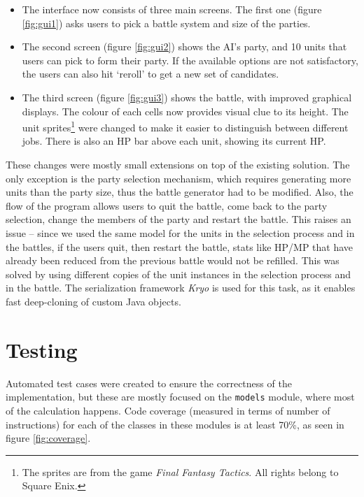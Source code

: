 \begin{itemize}
	\item The interface now consists of three main screens. The first one (figure \ref{fig:gui1}) asks users to pick a battle system and size of the parties.
	\item The second screen (figure \ref{fig:gui2}) shows the AI's party, and 10 units that users can pick to form their party. If the available options are not satisfactory, the users can also hit `reroll' to get a new set of candidates.
	\item The third screen (figure \ref{fig:gui3}) shows the battle, with improved graphical displays. The colour of each cells now provides visual clue to its height. The unit sprites\footnote{The sprites are from the game \textit{Final Fantasy Tactics}. All rights belong to Square Enix.} were changed to make it easier to distinguish between different jobs. There is also an HP bar above each unit, showing its current HP.
\end{itemize}

These changes were mostly small extensions on top of the existing solution. The only exception is the party selection mechanism, which requires generating more units than the party size, thus the battle generator had to be modified. Also, the flow of the program allows users to quit the battle, come back to the party selection, change the members of the party and restart the battle. This raises an issue -- since we used the same model for the units in the selection process and in the battles, if the users quit, then restart the battle, stats like HP/MP that have already been reduced from the previous battle would not be refilled. This was solved by using different copies of the unit instances in the selection process and in the battle. The serialization framework \textit{Kryo} is used for this task, as it enables fast deep-cloning of custom Java objects.

\section{Testing}

Automated test cases were created to ensure the correctness of the implementation, but these are mostly focused on the \texttt{models} module, where most of the calculation happens. Code coverage (measured in terms of number of instructions) for each of the classes in these modules is at least 70\%, as seen in figure \ref{fig:coverage}.

